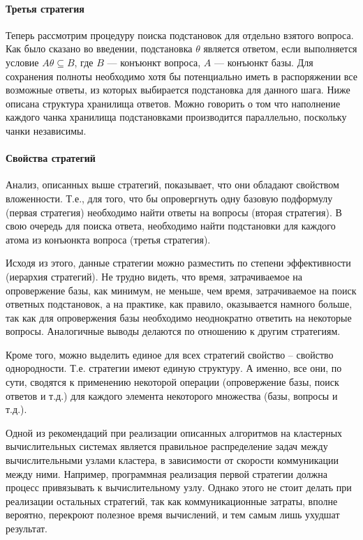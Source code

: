\paragraph{Третья стратегия}
Теперь рассмотрим процедуру поиска подстановок для отдельно взятого вопроса. Как было сказано во введении, подстановка $\theta$ является ответом, если выполняется условие $A\theta \subseteq B$, где $B$ --- конъюнкт вопроса, $A$ --- конъюнкт базы. Для сохранения полноты необходимо хотя бы потенциально иметь в распоряжении все возможные ответы, из которых выбирается подстановка для данного шага. Ниже описана структура хранилища ответов. Можно говорить о том что наполнение каждого чанка хранилища подстановками производится параллельно, поскольку чанки независимы.

\paragraph{Свойства стратегий}

Анализ, описанных выше стратегий, показывает, что они обладают свойством вложенности. Т.е., для того, что бы опровергнуть одну базовую подформулу (первая стратегия) необходимо найти ответы на вопросы (вторая стратегия). В свою очередь для поиска ответа, необходимо найти подстановки для каждого атома из конъюнкта вопроса (третья стратегия).

Исходя из этого, данные стратегии можно разместить по степени эффективности (иерархия стратегий). Не трудно видеть, что время, затрачиваемое на опровержение базы, как минимум, не меньше, чем время, затрачиваемое на поиск ответных подстановок, а на практике, как правило, оказывается намного больше, так как для опровержения базы необходимо неоднократно ответить на некоторые вопросы. Аналогичные выводы делаются по отношению к другим стратегиям.

Кроме того, можно выделить единое для всех стратегий свойство – свойство однородности. Т.е. стратегии имеют единую структуру. А именно, все они, по сути, сводятся к применению некоторой операции (опровержение базы, поиск ответов и т.д.) для каждого элемента некоторого множества (базы, вопросы и т.д.).

Одной из рекомендаций при реализации описанных алгоритмов на кластерных вычислительных системах является правильное распределение задач между вычислительными узлами кластера, в зависимости от скорости коммуникации между ними. Например, программная реализация первой стратегии должна процесс привязывать к вычислительному узлу. Однако этого не стоит делать при реализации остальных стратегий, так как коммуникационные затраты, вполне вероятно, перекроют полезное время вычислений, и тем самым лишь ухудшат результат.

